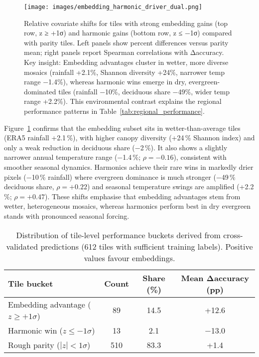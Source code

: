\documentclass[utf8]{FrontiersinHarvard}
\begin{document}
\begin{figure}[H]
    \centering
    \texttt{[image: images/embedding\_harmonic\_driver\_dual.png]}
    \caption{Relative covariate shifts for tiles with strong embedding gains (top row, z ≥ +1σ) and harmonic gains (bottom row, z ≤ −1σ) compared with parity tiles. Left panels show percent differences versus parity mean; right panels report Spearman correlations with Δaccuracy. Key insight: Embedding advantages cluster in wetter, more diverse mosaics (rainfall +2.1\%, Shannon diversity +24\%, narrower temp range −1.4\%), whereas harmonic wins emerge in dry, evergreen-dominated tiles (rainfall −10\%, deciduous share −49\%, wider temp range +2.2\%). This environmental contrast explains the regional performance patterns in Table~\ref{tab:regional_performance}.}
    \label{fig:driver_deltas}
\end{figure}

Figure~\ref{fig:driver_deltas} confirms that the embedding subset sits in wetter-than-average tiles (ERA5 rainfall +2.1\,\%), with higher canopy diversity (+24\,\% Shannon index) and only a weak reduction in deciduous share (−2\,\%). It also shows a slightly narrower annual temperature range (−1.4\,\%; \(\rho = -0.16\)), consistent with smoother seasonal dynamics. Harmonics achieve their rare wins in markedly drier pixels (−10\,\% rainfall) where evergreen dominance is much stronger (−49\,\% deciduous share, \(\rho = +0.22\)) and seasonal temperature swings are amplified (+2.2\,\%; \(\rho = +0.47\)). These shifts emphasise that embedding advantages stem from wetter, heterogeneous mosaics, whereas harmonics perform best in dry evergreen stands with pronounced seasonal forcing.

\begin{table}[H]
    \centering
    \small
    \begin{tabular}{lccc}
        \toprule
        \textbf{Tile bucket} & \textbf{Count} & \textbf{Share (\%)} & \textbf{Mean Δaccuracy (pp)} \\
        \midrule
        Embedding advantage (\(z \ge +1\sigma\)) & 89 & 14.5 & +12.6 \\
        Harmonic win (\(z \le -1\sigma\)) & 13 & 2.1 & −13.0 \\
        Rough parity (\(|z| < 1\sigma\)) & 510 & 83.3 & +1.4 \\
        \bottomrule
    \end{tabular}
    \caption{Distribution of tile-level performance buckets derived from cross-validated predictions (612 tiles with sufficient training labels). Positive values favour embeddings.}
    \label{tab:tile_buckets}
\end{table}
\end{document}
